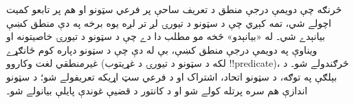 \documentclass[../../../include/open-logic-section]{subfiles}
\begin{document}


څرنګه چې دويمې درجې منطق د تعريف ساحې پر فرعي سټونو او هم پر
تابعو کميت اچولے شي، تمه کېږي چې د سټونو د تيورۍ لږ تر لږه يوه
برخه په دې منطق کښې بيانېدے شي۔ له «بيانېدو» څخه مو مطلب دا دے
چې د سټونو د تيورۍ خاصيتونه او ويناوې په دويمې درجې منطق کښې،
بې له دې چې د سټونو دپاره کوم ځانګړے غيرمنطقي لغت وکاروو
(لکه د سټونو د تيورۍ د غړيتوب !!{predicate})، څرګندولے شو۔
د بېلګې په توګه، د سټونو اتحاد، اشتراک او د فرعي سټ اړيکه
تعريفولے شو؛ د سټونو اندازې هم سره پرتله کولے شو او د
کانتور د قضيې غوندې پايلې بيانولے شو۔
\end{document}
